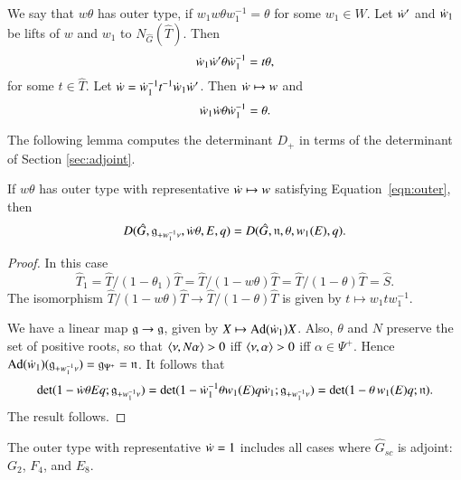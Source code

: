 We say that $w\theta$ has outer type, if $w_1 w \theta
w_1^{-1}=\theta$ for some $w_1\in W$.  Let $\dot w'$ and $\dot w_1$ be
lifts of $w$ and $w_1$ to $N_{\hat G}(\hat T)$.  Then
\[
\dot w_1 \dot w' \theta\dot w_1^{-1} = t\theta,
\]
for some $t\in \hat T$.  Let $\dot w = \dot w_1^{-1} t^{-1}
\dot w_1\dot w'$.  Then $\dot w\mapsto w$ and
\begin{equation}\label{eqn:outer}
\dot w_1\dot w \theta\dot w_1^{-1} = \theta.
\end{equation}

The following lemma computes the determinant $D_+$ in terms of the
determinant of Section \ref{sec:adjoint}.

\begin{lemma} 
  If $w\theta$ has outer type with representative $\dot w\mapsto w$
  satisfying Equation~\ref{eqn:outer}, then
\[
D(\hat G,{\mathfrak g}_{+w_1^{-1}\nu},\dot w\theta,E,q) 
= D(\hat G,{\mathfrak n},\theta,w_1(E),q).
\]
\end{lemma}

\begin{proof}
  In this case
\begin{equation}
\hat T_1 = \hat T/(1-\theta_1) \hat T 
= \hat T/(1-w \theta)\hat T 
= \hat T/(1-\theta)\hat T = \hat S.
\end{equation}
The isomorphism $\hat T/(1-w \theta)\hat T\to \hat T/(1-\theta)\hat T$
is given by $t \mapsto w_1 t w_1^{-1}$.

We have a linear map ${\mathfrak g}\to{\mathfrak g}$, given by $X\mapsto {\operatorname{Ad}}(\dot w_1)
X$.  Also, $\theta$ and $N$ preserve the set of positive roots, so
that $\langle{\nu,N\alpha}\rangle>0$ iff $\langle{\nu,\alpha}\rangle>0$ iff $\alpha\in
\Psi^+$.  Hence ${\operatorname{Ad}}(\dot w_1)({\mathfrak g}_{+w_1^{-1}\nu}) = {\mathfrak g}_{\Psi^+} =
{\mathfrak n}$.  It follows that
\[
\det(1- \dot w \theta E q; {\mathfrak g}_{+w_1^{-1}\nu}) = \det(1 - \dot w_1^{-1}\theta w_1 (E) q\dot w_1; {\mathfrak g}_{+w_1^{-1}\nu} ) = \det(1 - \theta\, w_1(E) q;{\mathfrak n}).
\]
The result follows.
\end{proof}

The outer type with representative $\dot w = 1$ includes all cases
where $\hat G_{sc}$ is adjoint: $G_2$, $F_4$, and $E_8$.

